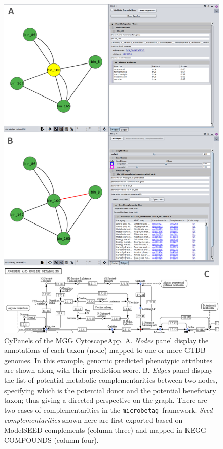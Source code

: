 \documentclass[sn-mathphys,Numbered]{sn-jnl}  %
\theoremstyle{thmstyleone}%
\theoremstyle{thmstyletwo}%
\theoremstyle{thmstylethree}%
\newcommand{\microbetag}{\texttt{microbetag }}
\begin{document}
        \newpage
        \begin{figure}[H]
            \centering
            \includegraphics*[width=0.85\columnwidth]{figs/cyPanel.png}
            \caption{
                CyPanels of the MGG CytoscapeApp. 
                A. \textit{Nodes} panel display the annotations of each taxon (node) mapped to one or more GTDB genomes.
                In this example, genomic predicted phenotypic attributes are shown along with their prediction score.
                B. \textit{Edges} panel display the list of potential metabolic complementarities between two nodes, specifying which is the potential donor and the potential beneficiary taxon; thus giving a directed perspective on the graph. There are two cases of complementarities in the \microbetag framework. 
                \textit{Seed complementarities} shown here are first exported based on ModelSEED complements (column three) and mapped in KEGG COMPOUNDS (column four). 
}
\end{figure}
\end{document}
